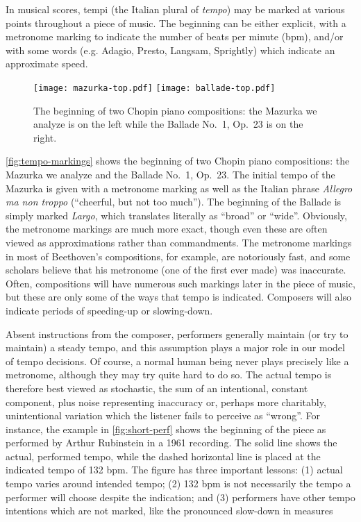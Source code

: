 \documentclass[12pt]{article}
\begin{document}
In musical scores, tempi (the Italian plural of {\em tempo}) may be
marked at various points throughout a piece of music. The
beginning can be either explicit, with a metronome marking to
indicate the number of beats per minute (bpm), and/or with some words
(e.g. Adagio, Presto, Langsam, Sprightly) which indicate an
approximate speed. 
\begin{figure}[t!]
  \centering
  \texttt{[image: mazurka-top.pdf]}
  \texttt{[image: ballade-top.pdf]}
  \caption{The beginning of two Chopin piano compositions: the Mazurka
    we analyze is on the left while the Ballade No.\ 1, Op.\ 23 is on
    the right.}
  \label{fig:tempo-markings}
\end{figure}
\autoref{fig:tempo-markings} shows the beginning of two Chopin piano
compositions: the Mazurka we analyze and the Ballade No.\ 1, Op.\ 23. The initial tempo of the Mazurka is given with a metronome
marking as well as the Italian phrase {\em Allegro ma non troppo}
(``cheerful, but not too much''). The beginning of the Ballade is simply
marked {\em Largo}, which translates literally as ``broad'' or
``wide''. Obviously, the metronome markings are much more exact,
though even these are often viewed as approximations rather than
commandments. The metronome markings in most of Beethoven's
compositions, for example, are notoriously fast, and some scholars
believe that his metronome (one of the first ever made) was
inaccurate. Often, compositions will have numerous such markings later
in the piece of music, but these are only some of the ways that tempo
is indicated. Composers will also indicate periods of speeding-up or
slowing-down.

Absent instructions from the composer, performers generally maintain
(or try to maintain) a steady tempo, and this assumption plays a major
role in our model of tempo decisions. Of course, a normal human being
never plays precisely like a 
metronome, although they may try quite hard to do so. The actual
tempo is therefore best viewed as stochastic, the sum of an
intentional, constant component, plus noise representing inaccuracy
or, perhaps more charitably, unintentional variation which the
listener fails to perceive as ``wrong''. For instance, the example in
\autoref{fig:short-perf} shows the beginning of the piece as performed
by Arthur Rubinstein in a 1961 recording. 
The solid line shows the
actual, performed tempo, while the dashed horizontal line is placed at
the indicated tempo of 132 bpm. The figure has three important
lessons: (1) actual tempo varies around intended tempo; (2) 132 bpm is
not necessarily the tempo a performer will choose despite the
indication; and (3) performers have other tempo intentions which are
not marked, like the pronounced slow-down in measures 
\end{document}
